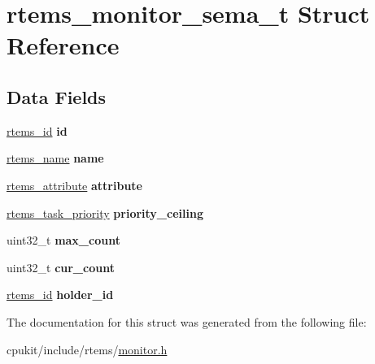 \hypertarget{structrtems__monitor__sema__t}{}\section{rtems\+\_\+monitor\+\_\+sema\+\_\+t Struct Reference}
\label{structrtems__monitor__sema__t}
\subsection*{Data Fields}
\begin{DoxyCompactItemize}
\item 
\mbox{\label{structrtems__monitor__sema__t_a379b9ea0a2a9f4244fecd305f2aa81a2}} 
\mbox{\hyperlink{group__ClassicTasks_gab20892b814dced7dd4e5b9bf42becd57}{rtems\+\_\+id}} {\bfseries id}
\item 
\mbox{\label{structrtems__monitor__sema__t_ae4dc30c237dff0a8d4de717287826fc6}} 
\mbox{\hyperlink{group__ClassicTasks_ga55fb63c49f68c0cbd9bee004da15b1fd}{rtems\+\_\+name}} {\bfseries name}
\item 
\mbox{\label{structrtems__monitor__sema__t_a2a91d48637f008b8e9c458efb1da8bd9}} 
\mbox{\hyperlink{group__ClassicAttributes_gaea40313cf78ed843e09c4315d0a10f79}{rtems\+\_\+attribute}} {\bfseries attribute}
\item 
\mbox{\label{structrtems__monitor__sema__t_af39ee972eec15c993e645c1573d50a82}} 
\mbox{\hyperlink{group__ClassicTasks_gaa80a0c0938307d1e99d0eb5fee765b47}{rtems\+\_\+task\+\_\+priority}} {\bfseries priority\+\_\+ceiling}
\item 
\mbox{\label{structrtems__monitor__sema__t_a491afa740605a9ba0678cf76ebe78d51}} 
uint32\+\_\+t {\bfseries max\+\_\+count}
\item 
\mbox{\label{structrtems__monitor__sema__t_a80a44222e28daff6dfb72e7f929f9c31}} 
uint32\+\_\+t {\bfseries cur\+\_\+count}
\item 
\mbox{\label{structrtems__monitor__sema__t_a6c1b54e319234f8bd46cce972ae521ec}} 
\mbox{\hyperlink{group__ClassicTasks_gab20892b814dced7dd4e5b9bf42becd57}{rtems\+\_\+id}} {\bfseries holder\+\_\+id}
\end{DoxyCompactItemize}


The documentation for this struct was generated from the following file\+:\begin{DoxyCompactItemize}
\item 
cpukit/include/rtems/\mbox{\hyperlink{monitor_8h}{monitor.\+h}}\end{DoxyCompactItemize}
